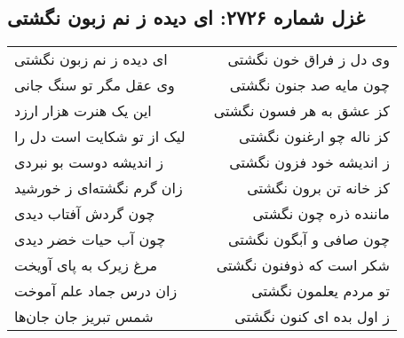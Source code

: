 \begin{center}
\section*{غزل شماره ۲۷۲۶: ای دیده ز نم زبون نگشتی}
\label{sec:2726}
\begin{longtable}{l p{0.5cm} r}
ای دیده ز نم زبون نگشتی
&&
وی دل ز فراق خون نگشتی
\\
وی عقل مگر تو سنگ جانی
&&
چون مایه صد جنون نگشتی
\\
این یک هنرت هزار ارزد
&&
کز عشق به هر فسون نگشتی
\\
لیک از تو شکایت است دل را
&&
کز ناله چو ارغنون نگشتی
\\
ز اندیشه دوست بو نبردی
&&
ز اندیشه خود فزون نگشتی
\\
زان گرم نگشته‌ای ز خورشید
&&
کز خانه تن برون نگشتی
\\
چون گردش آفتاب دیدی
&&
ماننده ذره چون نگشتی
\\
چون آب حیات خضر دیدی
&&
چون صافی و آبگون نگشتی
\\
مرغ زیرک به پای آویخت
&&
شکر است که ذوفنون نگشتی
\\
زان درس جماد علم آموخت
&&
تو مردم یعلمون نگشتی
\\
شمس تبریز جان جان‌ها
&&
ز اول بده ای کنون نگشتی
\\
\end{longtable}
\end{center}
